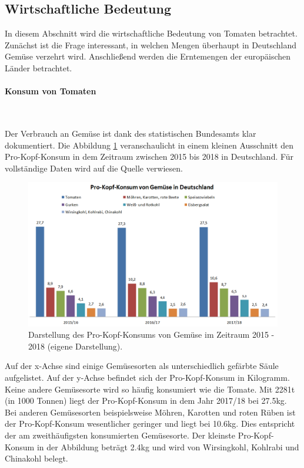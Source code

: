 \subsection{Wirtschaftliche Bedeutung}

In diesem Abschnitt wird die wirtschaftliche Bedeutung von Tomaten betrachtet. Zunächst ist die Frage interessant, in welchen Mengen überhaupt in Deutschland Gemüse verzehrt wird. Anschließend werden die Erntemengen der europäischen Länder betrachtet.

\paragraph{Konsum von Tomaten}
~\newline

Der Verbrauch an Gemüse ist dank des statistischen Bundesamts\cite{bundesamt} klar dokumentiert. Die Abbildung \ref{pro_kopf_konsum} veranschaulicht in einem kleinen Ausschnitt den Pro-Kopf-Konsum in dem Zeitraum zwischen 2015 bis 2018 in Deutschland. Für vollständige Daten wird auf die Quelle verwiesen.

\begin{figure}[h!]
	\centering
	\includegraphics[width=\textwidth]{bilder/pro_kopf_konsum.PNG}
	\caption{Darstellung des Pro-Kopf-Konsums von Gemüse im Zeitraum 2015 - 2018\cite{bundesamt} (eigene Darstellung).}
	\label{pro_kopf_konsum}
\end{figure}

Auf der x-Achse sind einige Gemüsesorten als unterschiedlich gefärbte Säule aufgelistet. Auf der y-Achse befindet sich der Pro-Kopf-Konsum in Kilogramm. Keine andere Gemüsesorte wird so häufig konsumiert wie die Tomate. Mit 2281t (in 1000 Tonnen) liegt der Pro-Kopf-Konsum in dem Jahr 2017/18 bei 27.5kg. Bei anderen Gemüsesorten beispielsweise Möhren, Karotten und roten Rüben ist der Pro-Kopf-Konsum wesentlicher geringer und liegt bei 10.6kg. Dies entspricht der am zweithäufigsten konsumierten Gemüsesorte. Der kleinste Pro-Kopf-Konsum in der Abbildung beträgt 2.4kg und wird von Wirsingkohl, Kohlrabi und Chinakohl belegt.



